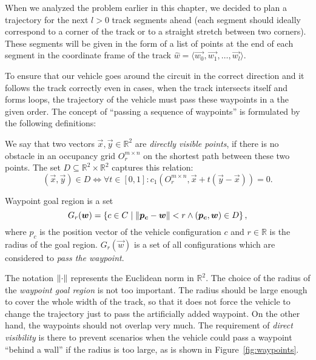 When we analyzed the problem earlier in this chapter, we decided to plan a trajectory for the next $l>0$ track segments ahead (each segment should ideally correspond to a corner of the track or to a straight stretch between two corners). These segments will be given in the form of a list of points at the end of each segment in the coordinate frame of the track $\hat{w}=\langle \vec{w_0}, \vec{w_1}, \ldots, \vec{w_l} \rangle$.

To ensure that our vehicle goes around the circuit in the correct direction and it follows the track correctly even in cases, when the track intersects itself and forms loops, the trajectory of the vehicle must pass these waypoints in a the given order. The concept of ``passing a sequence of waypoints'' is formulated by the following definitions:

\begin{defn}
	We say that two vectors $\vec{x},\vec{y}\in\mathbb{R}^2$ are \textit{directly visible points}, if there is no obstacle in an occupancy grid $O_r^{m\times n}$ on the shortest path between these two points. The set $D\subseteq \mathbb{R}^2\times\mathbb{R}^2$ captures this relation: 
	\[
		(\vec{x}, \vec{y}) \in D \iff \forall t \in \left[0, 1\right]: c_1(O_{r}^{m\times n}, \vec{x} + t(\vec{y}-\vec{x})) = 0.
	\]
\end{defn}

\begin{defn}[Waypoint]
	Waypoint goal region is a set
	\[
		G_r(\bm{w})=\left\{c\in C \mid \left\lVert\bm{p_c}-\bm{w}\right\rVert<r \land (\bm{p_c}, \bm{w}) \in D \right\},
	\]
	where $p_c$ is the position vector of the vehicle configuration $c$ and $r\in \mathbb{R}$ is the radius of the goal region. $G_r(\vec{w})$ is a set of all configurations which are considered to \textit{pass the waypoint}.
\end{defn}

The notation $\left\lVert\cdot\right\rVert$ represents the Euclidean norm in $\mathbb{R}^2$. The choice of the radius of the \textit{waypoint goal region} is not too important. The radius should be large enough to cover the whole width of the track, so that it does not force the vehicle to change the trajectory just to pass the artificially added waypoint. On the other hand, the waypoints should not overlap very much. The requirement of \textit{direct visibility} is there to prevent scenarios when the vehicle could pass a waypoint ``behind a wall'' if the radius is too large, as is shown in Figure~\ref{fig:waypoints}.

